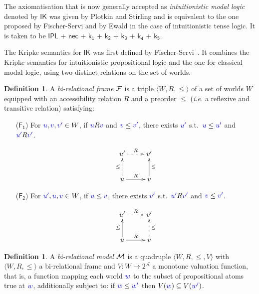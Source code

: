 \documentclass[a4paper]{article}
\theoremstyle{plain}
\theoremstyle{definition}
\newtheorem{definition}[theorem]{Definition}
\newcommand*{\ax}[1]{\mathsf{#1}}
\newcommand*{\kax}[1][]		{\ax{k_{#1}}}
\newcommand*{\IK}{\mathsf{IK}}
\newcommand*{\lb}[1]{{\color{blue}{#1}}}
\newcommand*{\accs}[2]{\lb{#1}R\lb{#2}}
\newcommand*{\futs}[2]{\lb{#1}\le{\color{blue}{#2}}}
\newcommand*{\rn}[1]  {\ensuremath{\mathsf{#1}}}
\newcommand*{\rel}{R}
\begin{document}
The axiomatisation that is now generally accepted as \emph{intuitionistic modal logic} denoted by $\IK$ was given by Plotkin and Stirling \cite{plotkin:stirling:86} and is equivalent to the one proposed by Fischer-Servi \cite{fischer-servi:84} and by Ewald \cite{ewald:jsl86} in the case of intuitionistic tense logic. It is taken to be    $\rn{IPL}$ $\rn{+}$ $\rn{nec}$ $\rn{+}$ $\kax[1]$ $\rn{+}$ $\kax[2]$ $\rn{+}$ $\kax[3]$ $\rn{+}$ $\kax[4]$  $\rn{+}$ $\kax[5]$.


The Kripke semantics for $\IK$ was first defined by Fischer-Servi~\cite{fischer-servi:84}.
%
It combines the Kripke semantics for intuitionistic propositional logic and the one for classical modal logic, using two distinct relations on the set of worlds.

\begin{definition}
	A \emph{bi-relational frame} $\mathcal{F}$ is a triple $\langle W, \rel, \le \rangle$ 
	of a set of worlds $W$ equipped with an {accessibility relation} $\rel$ and a preorder $\le$ (\emph{i.e.} a reflexive and transitive relation) satisfying:
	\begin{enumerate}
		\item[($\rn{F_1}$)] For $\lb u, \lb v, \lb{v'} \in W$, if $\accs uv$ and $\futs v{v'}$, there exists $\lb{u'}$ s.t.~$\futs u{u'}$ and $\accs{u'}{v'}$.
		
		\begin{equation*}
		\xymatrix{
			u' \ar@{.>}[r]^R  & v' \\
			u \ar@{.>}[u]^{\le} \ar@{->}[r]^R  & v \ar@{->}[u]_{\le}
		}
		\end{equation*}
		
		\item[($\rn{F_2}$)] For $\lb {u'}, \lb u, \lb v \in W$, if $\futs uv$, there exists $\lb {v'}$ s.t.~$\accs{u'}{v'}$ and $\futs v{v'}$.
		
		\begin{equation*}
		\xymatrix{
			u' \ar@{.>}[r]^R & v' \\
			u \ar@{->}[u]^{\le} \ar@{->}[r]^R & v \ar@{.>}[u]_{\le}
		}
		\end{equation*}
	\end{enumerate}
\end{definition}

\begin{definition}
	\label{model}
	A \emph{bi-relational model} $\mathcal{M}$ is a quadruple $\langle W, \rel,\le,V \rangle$ with $\langle W, \rel, \le \rangle$ a bi-relational frame and $V\colon W \to 2^\mathcal{A}$ a monotone valuation function, that is, a function mapping each world $\lb w$ to the subset of propositional atoms true at $\lb w$, additionally subject to:
	if $\lb w \le \lb{w'}$ then $V(\lb w)\subseteq V(\lb{w'})$.
\end{definition}
\end{document}
